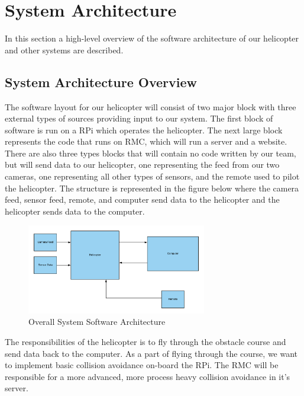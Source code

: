 \documentclass[onecolumn, draftclsnofoot, 10pt, compsoc]{IEEEtran}
\begin{document}
\section{System Architecture}

In this section a high-level overview of the software architecture of our helicopter and other systems are described.
\subsection{System Architecture Overview}

The software layout for our helicopter will consist of two major block with three external types of sources providing input to our system. The first block of software is run on a RPi which operates the helicopter. The next large block represents the code that runs on RMC, which will run a server and a website. There are also three types blocks that will contain no code written by our team, but will send data to our helicopter, one representing the feed from our two cameras, one representing all other types of sensors, and the remote used to pilot the helicopter. The structure is represented in the figure below where the camera feed, sensor feed, remote, and computer send data to the helicopter and the helicopter sends data to the computer.

\begin{figure}[h]
    \centering
    \includegraphics[width=0.7\textwidth]{graphics/high_level_overall_arch.png}
    \caption{Overall System Software Architecture}
    \label{fig:OverallSystemArchitecture}
\end{figure}

The responsibilities of the helicopter is to fly through the obstacle course and send data back to the computer. As a part of flying through the course, we want to implement basic collision avoidance on-board the RPi. The RMC will be responsible for a more advanced, more process heavy collision avoidance in it's server.
\end{document}
